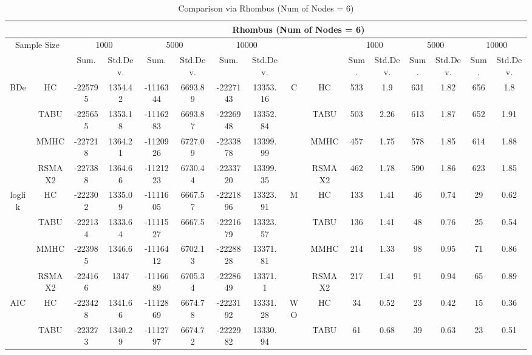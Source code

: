\begin{table}[p]																										
\centering	\caption{Comparison via Rhombus (Num of Nodes = 6)}	\tiny																						
{\tabcolsep=0.01in																										
\begin{tabular}{cc||cc|cc|cc||cc|cc|cc|cc}																										
\hline																										
&	&	\multicolumn{14}{c}{Rhombus	(Num	of	Nodes	=	6)}\tabularnewline																			
\hline																										
\multicolumn{2}{c||}{Sample	Size}	&	\multicolumn{2}{c|}{1000}	&	\multicolumn{2}{c|}{5000}	&	\multicolumn{2}{c||}{10000}	&	&	&	\multicolumn{2}{c|}{1000}	&	\multicolumn{2}{c|}{5000}	&	\multicolumn{2}{c}{10000}\tabularnewline											
\hline																										
&	&	Sum.	&	Std.Dev.	&	Sum.	&	Std.Dev.	&	Sum.	&	Std.Dev.	&	&	&	Sum.	&	Std.Dev.	&	Sum.	&	Std.Dev.	&	Sum.	&	Std.Dev.\tabularnewline
\hline																										
\hline																										
\multirow{4}{*}{BDe} & HC &	-225795 & 	1354.42 & 	-1116344 & 	6693.89 & 	-2227143 & 	13353.16 & 	\multirow{4}{*}{C} & HC &	533 & 	1.9 & 	631 & 	1.82 & 	656 & 	1.8\tabularnewline													
& TABU &	-225655 & 	1353.18 & 	-1116283 & 	6693.87 & 	-2226948 & 	13352.84 & 	& TABU &	503 & 	2.26 & 	613 & 	1.87 & 	652 & 	1.91\tabularnewline													
& MMHC &	-227218 & 	1364.21 & 	-1120926 & 	6727.09 & 	-2233878 & 	13399.99 & 	& MMHC &	457 & 	1.75 & 	578 & 	1.85 & 	614 & 	1.88\tabularnewline													
& RSMAX2 &	-227388 & 	1364.66 & 	-1121223 & 	6730.44 & 	-2233720 & 	13399.35 & 	& RSMAX2 &	462 & 	1.78 & 	590 & 	1.86 & 	623 & 	1.85\tabularnewline													
\hline																										
\multirow{4}{*}{loglik} & HC &	-222302 & 	1335.09 & 	-1111605 & 	6667.57 & 	-2221896 & 	13323.91 & 	\multirow{4}{*}{M} & HC &	133 & 	1.41 & 	46 & 	0.74 & 	29 & 	0.62\tabularnewline													
& TABU &	-222134 & 	1333.64 & 	-1111527 & 	6667.5 & 	-2221679 & 	13323.57 & 	& TABU &	136 & 	1.41 & 	48 & 	0.76 & 	25 & 	0.54\tabularnewline													
& MMHC &	-223985 & 	1346.6 & 	-1116412 & 	6702.13 & 	-2228828 & 	13371.81 & 	& MMHC &	214 & 	1.33 & 	98 & 	0.95 & 	71 & 	0.86\tabularnewline													
& RSMAX2 &	-224166 & 	1347 & 	-1116689 & 	6705.34 & 	-2228649 & 	13371.1 & 	& RSMAX2 &	217 & 	1.41 & 	91 & 	0.94 & 	65 & 	0.89\tabularnewline													
\hline																										
\multirow{4}{*}{AIC} & HC &	-223428 & 	1341.66 & 	-1112869 & 	6674.78 & 	-2223192 & 	13331.28 & 	\multirow{4}{*}{WO} & HC &	34 & 	0.52 & 	23 & 	0.42 & 	15 & 	0.36\tabularnewline													
& TABU &	-223273 & 	1340.29 & 	-1112797 & 	6674.72 & 	-2222982 & 	13330.94 & 	& TABU &	61 & 	0.68 & 	39 & 	0.63 & 	23 & 	0.51\tabularnewline													

\end{tabular}}
\end{table}
